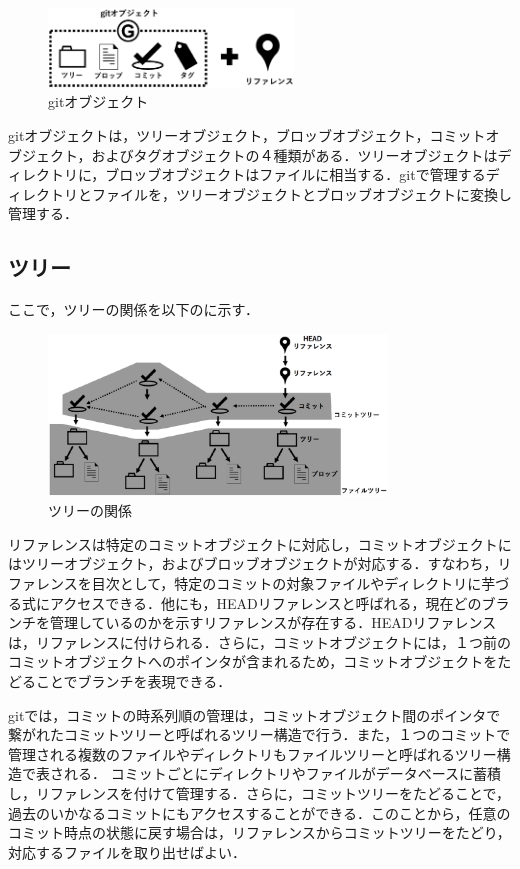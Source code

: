 \documentclass[a4j,9pt,twocolumn]{jsarticle}
\begin{document}
\begin{figure}[h]
\centering
\includegraphics[width=65mm]{img/git_obj2.eps}
\caption{gitオブジェクト}
\label{object2}
\end{figure}

gitオブジェクトは，ツリーオブジェクト，ブロッブオブジェクト，コミットオブジェクト，およびタグオブジェクトの４種類がある．ツリーオブジェクトはディレクトリに，ブロッブオブジェクトはファイルに相当する．gitで管理するディレクトリとファイルを，ツリーオブジェクトとブロッブオブジェクトに変換し管理する．

\subsection{ツリー}
ここで，ツリーの関係を以下のに示す．

\begin{figure}[h]
\centering
\includegraphics[width=90mm]{img/tree.eps}
\caption{ツリーの関係}
\label{tree}
\end{figure}

リファレンスは特定のコミットオブジェクトに対応し，コミットオブジェクトにはツリーオブジェクト，およびブロッブオブジェクトが対応する．すなわち，リファレンスを目次として，特定のコミットの対象ファイルやディレクトリに芋づる式にアクセスできる．他にも，HEADリファレンスと呼ばれる，現在どのブランチを管理しているのかを示すリファレンスが存在する．HEADリファレンスは，リファレンスに付けられる．さらに，コミットオブジェクトには，１つ前のコミットオブジェクトへのポインタが含まれるため，コミットオブジェクトをたどることでブランチを表現できる．

gitでは，コミットの時系列順の管理は，コミットオブジェクト間のポインタで繋がれたコミットツリーと呼ばれるツリー構造で行う．また，１つのコミットで管理される複数のファイルやディレクトリもファイルツリーと呼ばれるツリー構造で表される．
コミットごとにディレクトリやファイルがデータベースに蓄積し，リファレンスを付けて管理する．さらに，コミットツリーをたどることで，過去のいかなるコミットにもアクセスすることができる．このことから，任意のコミット時点の状態に戻す場合は，リファレンスからコミットツリーをたどり，対応するファイルを取り出せばよい．
\end{document}
